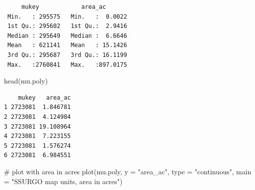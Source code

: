 \documentclass[
  letterpaper,
  DIV=11,
  numbers=noendperiod]{scrartcl}
\newenvironment{Shaded}{\begin{snugshade}}{\end{snugshade}}
\newcommand{\AttributeTok}[1]{\textcolor[rgb]{0.40,0.45,0.13}{#1}}
\newcommand{\CommentTok}[1]{\textcolor[rgb]{0.37,0.37,0.37}{#1}}
\newcommand{\FunctionTok}[1]{\textcolor[rgb]{0.28,0.35,0.67}{#1}}
\newcommand{\NormalTok}[1]{\textcolor[rgb]{0.00,0.23,0.31}{#1}}
\newcommand{\StringTok}[1]{\textcolor[rgb]{0.13,0.47,0.30}{#1}}
\begin{document}
\begin{verbatim}
     mukey            area_ac        
 Min.   : 295575   Min.   :  0.0022  
 1st Qu.: 295602   1st Qu.:  2.9416  
 Median : 295649   Median :  6.6646  
 Mean   : 621141   Mean   : 15.1426  
 3rd Qu.: 295687   3rd Qu.: 16.1199  
 Max.   :2760841   Max.   :897.0175  
\end{verbatim}

\begin{Shaded}
\begin{Highlighting}[]
\FunctionTok{head}\NormalTok{(mu.poly)}
\end{Highlighting}
\end{Shaded}

\begin{verbatim}
    mukey   area_ac
1 2723081  1.846781
2 2723081  4.124984
3 2723081 19.108964
4 2723081  7.223155
5 2723081  1.576274
6 2723081  6.984551
\end{verbatim}

\begin{Shaded}
\begin{Highlighting}[]
\CommentTok{\# plot with area in acres}
\FunctionTok{plot}\NormalTok{(mu.poly, }\AttributeTok{y =} \StringTok{"area\_ac"}\NormalTok{,}
     \AttributeTok{type =} \StringTok{"continuous"}\NormalTok{,}
     \AttributeTok{main =} \StringTok{"SSURGO map units, area in acres"}\NormalTok{)}
\end{Highlighting}
\end{Shaded}
\end{document}
